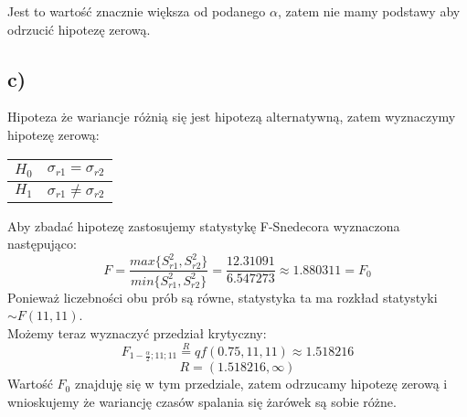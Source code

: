 \documentclass{article}
\begin{document}
Jest to wartość znacznie większa od podanego $\alpha$, zatem nie mamy podstawy aby odrzucić hipotezę zerową.

\subsection{c)}
Hipoteza że wariancje różnią się jest hipotezą alternatywną, zatem wyznaczymy hipotezę zerową:
\begin{center} \begin{tabular}{|c|c|} \hline
$H_0$ & $\sigma_{r1} = \sigma_{r2}$ \\ \hline
$H_1$ & $\sigma_{r1} \neq \sigma_{r2}$ \\ \hline
\end{tabular} \end{center}

Aby zbadać hipotezę zastosujemy statystykę F-Snedecora wyznaczona następująco:
\[ F = \frac{max\{S_{r1}^2, S_{r2}^2\}}{min\{S_{r1}^2, S_{r2}^2\}} = \frac{12.31091}{6.547273} \approx 1.880311 = F_0 \]
Ponieważ liczebności obu prób są równe, statystyka ta ma rozkład statystyki $\sim F(11,11)$. \\
Możemy teraz wyznaczyć przedział krytyczny:
\[ F_{1-\frac{\alpha}{2};11;11} \overset{R}{=} qf(0.75, 11, 11) \approx 1.518216 \]
\[ R = (1.518216, \infty) \]
Wartość $F_0$ znajduję się w tym przedziale, zatem odrzucamy hipotezę zerową i wnioskujemy że wariancję czasów spalania się żarówek są sobie różne.

\begin{comment}
\newpage
\section{Zadanie 5}
Na podstawie danych zawartych w pliku CARDATA postawić i zweryfikować hipotezy dotyczące:
\begin{enumerate}[label = \alph*)]
\item wartości oczekiwanych oraz wariancji zużycia paliwa na 100 km dla populacji wszystkich samochodów oraz populacji samochodów europejskich, amerykańskich i japońskich.
\item Różnic wartości oczekiwanych zużycia paliwa na 100 km samochodów europejskich, amerykańskich i japońskich.
\item Ilorazów wariancji zużycia paliwa samochodów europej-skich, amerykańskich i japońskich.
\item Wskaźnika oraz różnic wskaźników samochodów europej-skich, amerykańskich i japońskich, które zużywają więcej paliwa niż estymowana średnia światowa plus 1,5 estymo-wanego odchylenia standardowego.
\end{enumerate}
\end{comment}
\end{document}
